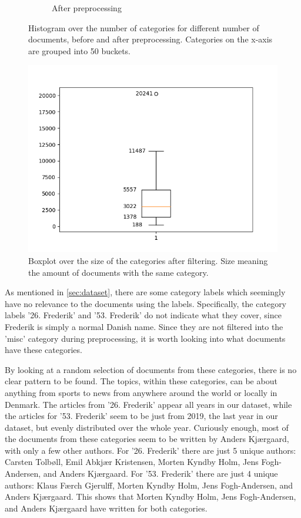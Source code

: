 \begin{figure}[ht]
\begin{subfigure}{0.45\textwidth}
		\caption{After preprocessing}
		\label{fig:category_hist_after}
	\end{subfigure}
	\caption{Histogram over the number of categories for different number of documents, before and after preprocessing.
	Categories on the x-axis are grouped into 50 buckets.}
	\label{fig:category_hist}
\end{figure}

\begin{figure}
	\centering
	\includegraphics[width=.5\linewidth]{figures/category_box.png}
	\caption{Boxplot over the size of the categories after filtering. Size meaning the amount of documents with the same category.}
	\label{fig:category_box}
\end{figure}

As mentioned in \autoref{sec:dataset}, there are some category labels which seemingly have no relevance to the documents using the labels.
Specifically, the category labels '26. Frederik' and '53. Frederik' do not indicate what they cover, since Frederik is simply a normal Danish name.
Since they are not filtered into the 'misc' category during preprocessing, it is worth looking into what documents have these categories.

By looking at a random selection of documents from these categories, there is no clear pattern to be found.
The topics, within these categories, can be about anything from sports to news from anywhere around the world or locally in Denmark.
The articles from '26. Frederik' appear all years in our dataset, while the articles for '53. Frederik' seem to be just from 2019, the last year in our dataset, but evenly distributed over the whole year.
Curiously enough, most of the documents from these categories seem to be written by Anders Kjærgaard, with only a few other authors.
For '26. Frederik' there are just 5 unique authors: Carsten Tolbøll, Emil Abkjær Kristensen, Morten Kyndby Holm, Jens Fogh-Andersen, and Anders Kjærgaard.
For '53. Frederik' there are just 4 unique authors: Klaus Færch Gjerulff, Morten Kyndby Holm, Jens Fogh-Andersen, and Anders Kjærgaard.
This shows that Morten Kyndby Holm, Jens Fogh-Andersen, and Anders Kjærgaard have written for both categories.

